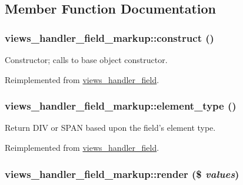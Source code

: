 \subsection{Member Function Documentation}
\hypertarget{classviews__handler__field__markup_ddc5d6e6130133c1d65d8b96dce502a5}{
\subsubsection[{construct}]{\setlength{\rightskip}{0pt plus 5cm}views\_\-handler\_\-field\_\-markup::construct ()}}
\label{classviews__handler__field__markup_ddc5d6e6130133c1d65d8b96dce502a5}


Constructor; calls to base object constructor. 

Reimplemented from \hyperlink{classviews__handler__field_3d50050864c255b71c842972a45d39f6}{views\_\-handler\_\-field}.\hypertarget{classviews__handler__field__markup_0de6d7c5e99dfd22ce7e7a4662af8082}{
\subsubsection[{element\_\-type}]{\setlength{\rightskip}{0pt plus 5cm}views\_\-handler\_\-field\_\-markup::element\_\-type ()}}
\label{classviews__handler__field__markup_0de6d7c5e99dfd22ce7e7a4662af8082}


Return DIV or SPAN based upon the field's element type. 

Reimplemented from \hyperlink{classviews__handler__field_dc0ac73a91e5bfb8da464b3a804a7aa9}{views\_\-handler\_\-field}.\hypertarget{classviews__handler__field__markup_7a6eb0c91f30643eb29d19dcc76b23d3}{
\subsubsection[{render}]{\setlength{\rightskip}{0pt plus 5cm}views\_\-handler\_\-field\_\-markup::render (\$ {\em values})}}
\label{classviews__handler__field__markup_7a6eb0c91f30643eb29d19dcc76b23d3}


